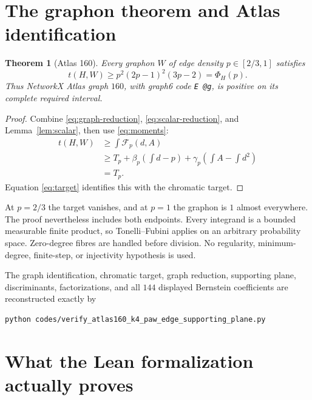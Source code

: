 \documentclass[11pt]{article}
\newtheorem{theorem}{Theorem}[section]
\begin{document}
\section{The graphon theorem and Atlas identification}

\begin{theorem}[Atlas 160]\label{thm:main}
Every graphon $W$ of edge density $p\in[2/3,1]$ satisfies
\[
 \boxed{
 t(H,W)\ge p^2(2p-1)^2(3p-2)=\Phi_H(p).
 }
\]
Thus NetworkX Atlas graph $160$, with graph6 code \texttt{E @g},
is positive on its complete required interval.
\end{theorem}

\begin{proof}
Combine \eqref{eq:graph-reduction}, \eqref{eq:scalar-reduction}, and
Lemma~\ref{lem:scalar}, then use \eqref{eq:moments}:
\begin{align*}
 t(H,W)
 &\ge\int\mathcal F_p(d,A)\\
 &\ge T_p+\beta_p\left(\int d-p\right)
       +\gamma_p\left(\int A-\int d^2\right)\\
 &=T_p.
\end{align*}
Equation \eqref{eq:target} identifies this with the chromatic target.
\end{proof}

At $p=2/3$ the target vanishes, and at $p=1$ the graphon is $1$ almost
everywhere.  The proof nevertheless includes both endpoints.  Every
integrand is a bounded measurable finite product, so Tonelli--Fubini applies
on an arbitrary probability space.  Zero-degree fibres are handled before
division.  No regularity, minimum-degree, finite-step, or injectivity
hypothesis is used.

The graph identification, chromatic target, graph reduction, supporting
plane, discriminants, factorizations, and all $144$ displayed Bernstein
coefficients are reconstructed exactly by
\begin{verbatim}
python codes/verify_atlas160_k4_paw_edge_supporting_plane.py
\end{verbatim}
\appendix
\section{What the Lean formalization actually proves}
\end{document}
